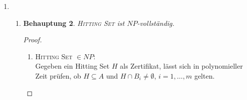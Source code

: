 \documentclass[a4paper]{scrartcl}
\newtheorem*{proposition}{Behauptung}
\newcommand{\Oh}{\mathcal{O}}
\begin{document}
\begin{enumerate}[label=\bfseries \arabic*.]
\begin{enumerate}
\begin{proof}
\begin{enumerate}
        \end{enumerate}
        Aus i. und ii. folgt, dass \textsc{4D-Matching} $NP$-vollständig ist.
    \end{proof}

    \item
        \begin{proposition}
            \textsc{$k$-Clique} ist für kein festes $k \geq 1$
            $NP$-vollständig, solange $P \neq NP$.
        \end{proposition}
        \begin{proof}
            Wir zeigen, dass \textsc{$k$-Clique} $\in P$, indem wir einen
            Algorithmus angeben, der \textsc{$k$-Clique} in Polynomialzeit
            entscheidet.
            Sei $n = |V|$.
            Dann gibt es $\binom{n}{k} \in \Oh(n^k)$ Subgraphen der Größe $k$.
            In jedem dieser Subgraphen gibt es $\Oh(k^2)$ Kanten, die auf
            Existenz überprüft werden müssen.
            Damit kann \textsc{$k$-Clique} in $\Oh(n^kk^2)$ entschieden werden,
            also in Polynomialzeit, da $k$ fix ist.

            Damit ist \textsc{$k$-Clique} nicht $NP$-vollständig, solange $P \neq NP$.
        \end{proof}

\end{enumerate}

\item %
\begin{enumerate}
    \item
        \begin{proposition}
            \textsc{Hitting Set} ist $NP$-vollständig.
        \end{proposition}
        \begin{proof}
            \hfill \\
            \begin{enumerate}
                \item \textsc{Hitting Set} $\in NP$: \\
                    Gegeben ein Hitting Set $H$ als Zertifikat, lässt sich in
                    polynomieller Zeit prüfen, ob $H \subseteq A$ und $H \cap
                    B_i \neq \emptyset$, $i = 1, \dotsc, m$ gelten.


\end{enumerate}
\end{proof}
\end{enumerate}
\end{enumerate}
\end{document}
